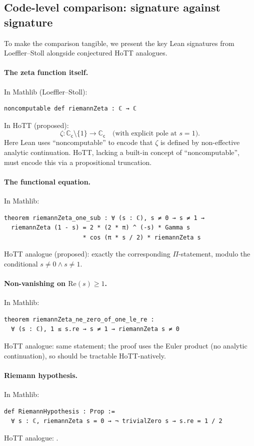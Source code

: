 \documentclass[12pt]{article}
\theoremstyle{definition}
\theoremstyle{remark}
\newcommand{\C}{\mathbb{C}}
\newcommand{\Cc}{\C_{\mathsf{c}}}
\begin{document}
\subsection{Code-level comparison: signature against signature}\label{subsec:LSsigs}

To make the comparison tangible, we present the key Lean signatures from
Loeffler--Stoll alongside conjectured HoTT analogues.

\paragraph{The zeta function itself.}
In Mathlib (Loeffler--Stoll):
\begin{verbatim}
noncomputable def riemannZeta : ℂ → ℂ
\end{verbatim}
In HoTT (proposed):
\[
\zeta : \Cc \setminus \{1\} \to \Cc \quad \text{(with explicit pole at $s=1$)}.
\]
Here Lean uses ``noncomputable'' to encode that $\zeta$ is defined by
non-effective analytic continuation. HoTT, lacking a built-in concept of
``noncomputable'', must encode this via a propositional truncation.

\paragraph{The functional equation.}
In Mathlib:
\begin{verbatim}
theorem riemannZeta_one_sub : ∀ (s : ℂ), s ≠ 0 → s ≠ 1 →
  riemannZeta (1 - s) = 2 * (2 * π) ^ (-s) * Gamma s
                      * cos (π * s / 2) * riemannZeta s
\end{verbatim}
HoTT analogue (proposed): exactly the corresponding $\Pi$-statement, modulo
the conditional $s \neq 0 \wedge s \neq 1$.

\paragraph{Non-vanishing on $\mathrm{Re}(s) \geq 1$.}
In Mathlib:
\begin{verbatim}
theorem riemannZeta_ne_zero_of_one_le_re :
  ∀ (s : ℂ), 1 ≤ s.re → s ≠ 1 → riemannZeta s ≠ 0
\end{verbatim}
HoTT analogue: same statement; the proof uses the Euler product (no
analytic continuation), so should be tractable HoTT-natively.

\paragraph{Riemann hypothesis.}
In Mathlib:
\begin{verbatim}
def RiemannHypothesis : Prop :=
  ∀ s : ℂ, riemannZeta s = 0 → ¬ trivialZero s → s.re = 1 / 2
\end{verbatim}
HoTT analogue: .
\end{document}
